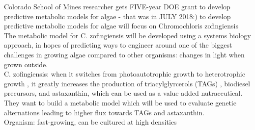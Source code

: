 \documentclass[11pt,a4paper,sans]{moderncv}
\begin{document}



Colorado School of Mines researcher gets FIVE-year DOE grant to develop predictive metabolic models for algae - that was in JULY 2018:) to develop predictive metabolic models for algae will focus on Chromochloris zofingiensis 
The metabolic model for C. zofingiensis will be developed using a systems biology approach, in hopes of predicting ways to engineer around one of the biggest challenges in growing algae compared to other organisms: changes in light when grown outside.\\
C. zofingiensis: when it switches from photoautotrophic growth to heterotrophic growth , it greatly increases the production of triacylglyrcerols (TAGs) , biodiesel precursors, and astaxanthin, which can be used as a value added nutraceutical.\\
They want to build a metabolic model which will be used to evaluate genetic alternations leading to higher flux towards TAGs and astaxanthin.\\
Organism:  fast-growing, can be cultured at high densities\\
\end{document}
